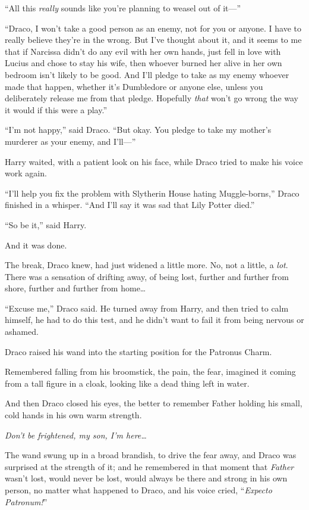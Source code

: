 “All this \emph{really} sounds like you’re planning to weasel out of it—”

“Draco, I won’t take a good person as an enemy, not for you or anyone. I have to really believe they’re in the wrong. But I’ve thought about it, and it seems to me that if Narcissa didn’t do any evil with her own hands, just fell in love with Lucius and chose to stay his wife, then whoever burned her alive in her own bedroom isn’t likely to be good. And I’ll pledge to take as my enemy whoever made that happen, whether it’s Dumbledore or anyone else, unless you deliberately release me from that pledge. Hopefully \emph{that} won’t go wrong the way it would if this were a play.”

“I’m not happy,” said Draco. “But okay. You pledge to take my mother’s murderer as your enemy, and I’ll—”

Harry waited, with a patient look on his face, while Draco tried to make his voice work again.

“I’ll help you fix the problem with Slytherin House hating Muggle-borns,” Draco finished in a whisper. “And I’ll say it was sad that Lily Potter died.”

“So be it,” said Harry.

And it was done.

The break, Draco knew, had just widened a little more. No, not a little, a \emph{lot}. There was a sensation of drifting away, of being lost, further and further from shore, further and further from home…

“Excuse me,” Draco said. He turned away from Harry, and then tried to calm himself, he had to do this test, and he didn’t want to fail it from being nervous or ashamed.

Draco raised his wand into the starting position for the Patronus Charm.

Remembered falling from his broomstick, the pain, the fear, imagined it coming from a tall figure in a cloak, looking like a dead thing left in water.

And then Draco closed his eyes, the better to remember Father holding his small, cold hands in his own warm strength.

\emph{Don’t be frightened, my son, I’m here…}

The wand swung up in a broad brandish, to drive the fear away, and Draco was surprised at the strength of it; and he remembered in that moment that \emph{Father} wasn’t lost, would never be lost, would always be there and strong in his own person, no matter what happened to Draco, and his voice cried, “\emph{Expecto Patronum!}”

